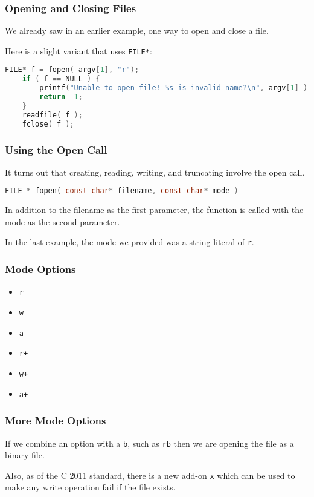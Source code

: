 \begin{frame}[fragile]
	\frametitle{Opening and Closing Files}
	We already saw in an earlier example, one way to open and close a file.
	
	Here is a slight variant that uses \texttt{FILE*}:
	
	\begin{lstlisting}[language=C]
    FILE* f = fopen( argv[1], "r");
    if ( f == NULL ) {
        printf("Unable to open file! %s is invalid name?\n", argv[1] );
        return -1;
    }
    readfile( f );
    fclose( f );
\end{lstlisting}
\end{frame}



\begin{frame}[fragile]
	\frametitle{Using the Open Call}

	It turns out that creating, reading, writing, and truncating involve the open call.

	\begin{lstlisting}[language=C]
FILE * fopen( const char* filename, const char* mode )
\end{lstlisting}

	In addition to the filename as the first parameter, the function is called with the mode as the second parameter.

	In the last example, the mode we provided was a string literal of \texttt{r}.

\end{frame}


\begin{frame}
	\frametitle{Mode Options}

	\begin{itemize}
		\item \texttt{r}
		\item \texttt{w}
		\item \texttt{a}
		\item \texttt{r+}
		\item \texttt{w+}
		\item \texttt{a+}
	\end{itemize}

\end{frame}


\begin{frame}
	\frametitle{More Mode Options}

	If we combine an option with a \texttt{b}, such as \texttt{rb} then we are opening the file as a binary file.

	Also, as of the C 2011 standard, there is a new add-on \texttt{x} which can be used to make any write operation fail if the file exists.

\end{frame}


